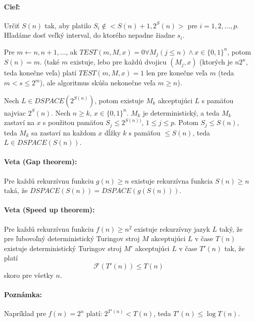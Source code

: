 \documentclass{article}
\begin{document}
\paragraph{Cieľ:} Určiť $S(n)$ tak, aby platilo $S_i \notin <S(n)+1, 2^S(n)>$
pre $i=1, 2, \ldots, p$. Hľadáme dosť veľký interval, do ktorého nepadne žiadne
$s_i$.
\par
Pre $m \leftarrow n, n+1, \ldots$, ak $TEST(m,M,x) = 0 \forall M_j (j \leq n)
\land x \in \{0, 1\}^n$, potom $S(n) = m$. (také $m$ existuje, lebo pre každú
dvojicu $(M_j,x)$ (ktorých je $n2^n$, teda konečne veľa) platí $TEST(m,M,x)=1$
len pre konečne veľa $m$ (teda $m < s \leq 2^m$), ale algoritmus skúša nekonečne
veľa $m\geq n$).

\par Nech $L \in DSPACE(2^{S(n)})$, potom existuje $M_k$ akceptujúci $L$ s
pamäťou najviac $2^S(n)$. Nech $n \geq k$, $x \in \{ 0, 1 \}^n$. $M_k$ je
deterministický, a teda $M_k$ zastaví na $x$ s použitou pamäťou $S_j \leq
2^{S(n))}$, $1 \leq j \leq p$. Potom $S_j \leq S(n)$, teda $M_k$ sa zastaví na
každom $x$ dĺžky $k$ s pamäťou $\leq S(n)$, teda $L \in DSPACE(S(n))$.

\paragraph{Veta (Gap theorem):} Pre každú rekurzívnu funkciu $g(n) \geq n$
existuje rekurzívna funkcia $S(n) \geq n$ taká, že
$DSPACE(S(n))=DSPACE(g(S(n)))$.

\paragraph{Veta (Speed up theorem):} Pre každú rekurzívnu funkciu $f(n) \geq
n^2$ existuje rekurzívny jazyk $L$ taký, že pre ľubovoľný deterministický
Turingov stroj $M$ akceptujúci $L$ v čase $T(n)$ existuje deterministický
Turingov stroj $M'$ akceptujúci $L$ v čase $T'(n)$ tak, že platí
$$
	\mathcal{F}(T'(n)) \leq T(n)
$$
skoro pre všetky $n$.
\paragraph{Poznámka:} Napríklad pre $f(n)=2^n$ platí: $2^{T'(n)} <T(n)$, teda
$T'(n) \leq \log T(n)$.
\end{document}
